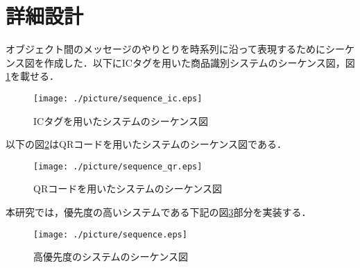 

\section{詳細設計}

オブジェクト間のメッセージのやりとりを時系列に沿って表現するためにシーケンス図を作成した．以下にICタグを用いた商品識別システムのシーケンス図，図\ref{sequence_ic}を載せる．

\begin{figure}[htbp]
\centering
\texttt{[image: ./picture/sequence\_ic.eps]}
\caption{ICタグを用いたシステムのシーケンス図}
\label{sequence_ic}
\end{figure}


以下の図\ref{sequence_qr}はQRコードを用いたシステムのシーケンス図である．


\begin{figure}[htbp]
\centering
\texttt{[image: ./picture/sequence\_qr.eps]}
\caption{QRコードを用いたシステムのシーケンス図}
\label{sequence_qr}
\end{figure}


本研究では，優先度の高いシステムである下記の図\ref{sequence}部分を実装する．


\begin{figure}[htbp]
\centering
\texttt{[image: ./picture/sequence.eps]}
\caption{高優先度のシステムのシーケンス図}
\label{sequence}
\end{figure}